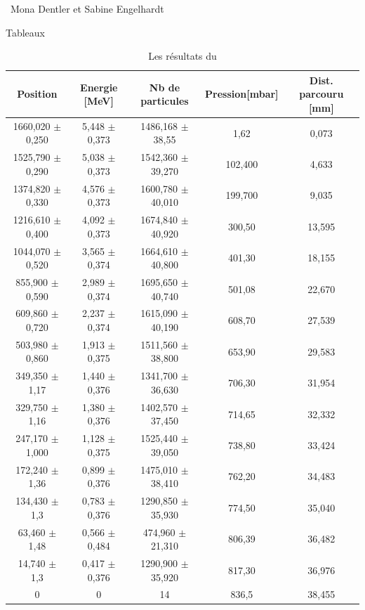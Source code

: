 \documentclass[a4paper,11pt,liststotocnumbered,bibtotocnumbered]{scrartcl}
\begin{document}
 \vspace{1cm}
 \begin{flushright}
  \titlefont \textcopyleft\ Mona Dentler et Sabine Engelhardt
 \end{flushright}

\newpage
 
 \begin{appendix}
  
    

  \begin{section}{Tableaux}
   \begin{table}[H]
    \begin{center}
     \begin{tabular}{c|c|c|c|c}
      Position	&Energie [MeV]	&Nb de particules	&Pression[mbar]	&Dist. parcouru [mm]\\ \hline
      1660,020 $\pm$ 0,250	&5,448 $\pm$ 0,373	&1486,168 $\pm$ 38,55	&1,62	&0,073\\		
      1525,790 $\pm$ 0,290	&5,038 $\pm$ 0,373	&1542,360 $\pm$ 39,270	&102,400	&4,633\\
      1374,820 $\pm$ 0,330	&4,576 $\pm$ 0,373	&1600,780 $\pm$ 40,010	&199,700	&9,035\\
      1216,610 $\pm$ 0,400	&4,092 $\pm$ 0,373	&1674,840 $\pm$ 40,920	&300,50	&13,595\\
      1044,070 $\pm$ 0,520	&3,565 $\pm$ 0,374	&1664,610 $\pm$ 40,800	&401,30	&18,155\\
      855,900 $\pm$ 0,590	&2,989 $\pm$ 0,374	&1695,650 $\pm$ 40,740	&501,08	&22,670\\
      609,860 $\pm$ 0,720	&2,237 $\pm$ 0,374	&1615,090 $\pm$ 40,190	&608,70	&27,539\\
      503,980 $\pm$ 0,860	&1,913 $\pm$ 0,375	&1511,560 $\pm$ 38,800	&653,90	&29,583\\
      349,350 $\pm$ 1,17	&1,440 $\pm$ 0,376	&1341,700 $\pm$ 36,630	&706,30	&31,954\\
      329,750 $\pm$ 1,16	&1,380 $\pm$ 0,376	&1402,570 $\pm$ 37,450	&714,65	&32,332\\
      247,170 $\pm$ 1,000	&1,128 $\pm$ 0,375	&1525,440 $\pm$ 39,050	&738,80	&33,424\\
      172,240 $\pm$ 1,36	&0,899 $\pm$ 0,376	&1475,010 $\pm$ 38,410	&762,20	&34,483\\
      134,430 $\pm$ 1,3		&0,783 $\pm$ 0,376	&1290,850 $\pm$ 35,930	&774,50	&35,040\\
      63,460 $\pm$ 1,48		&0,566 $\pm$ 0,484	&474,960 $\pm$ 21,310	&806,39	&36,482\\
      14,740 $\pm$ 1,3		&0,417 $\pm$ 0,376	&1290,900 $\pm$ 35,920	&817,30	&36,976\\
      0				&0 	&14			&836,5	&38,455\\
     \end{tabular}
    \caption{\label{tabelle-am} Les résultats du  }
    \end{center}
   \end{table}
   

\end{section}
\end{appendix}
\end{document}
